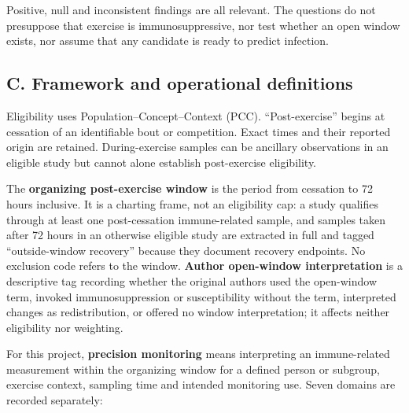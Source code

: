 \documentclass[
  11pt,
  a4paper,
]{article}
\begin{document}
Positive, null and inconsistent findings are all relevant. The questions
do not presuppose that exercise is immunosuppressive, nor test whether
an open window exists, nor assume that any candidate is ready to predict
infection.

\subsection{C. Framework and operational
definitions}\label{c.-framework-and-operational-definitions}

Eligibility uses Population--Concept--Context (PCC). ``Post-exercise''
begins at cessation of an identifiable bout or competition. Exact times
and their reported origin are retained. During-exercise samples can be
ancillary observations in an eligible study but cannot alone establish
post-exercise eligibility.

The \textbf{organizing post-exercise window} is the period from
cessation to 72 hours inclusive. It is a charting frame, not an
eligibility cap: a study qualifies through at least one post-cessation
immune-related sample, and samples taken after 72 hours in an otherwise
eligible study are extracted in full and tagged ``outside-window
recovery'' because they document recovery endpoints. No exclusion code
refers to the window. \textbf{Author open-window interpretation} is a
descriptive tag recording whether the original authors used the
open-window term, invoked immunosuppression or susceptibility without
the term, interpreted changes as redistribution, or offered no window
interpretation; it affects neither eligibility nor weighting.

For this project, \textbf{precision monitoring} means interpreting an
immune-related measurement within the organizing window for a defined
person or subgroup, exercise context, sampling time and intended
monitoring use. Seven domains are recorded separately:
\end{document}

